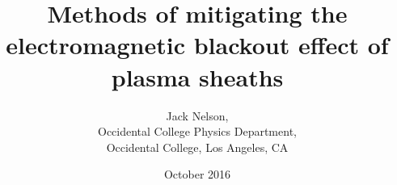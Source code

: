 \documentclass[twocolumn]{article}
\begin{document}
\title{Methods of mitigating the electromagnetic blackout effect of plasma sheaths}
\author{Jack Nelson,\\
	Occidental College Physics Department,\\
	Occidental College, Los Angeles, CA}
\date{October 2016}
\maketitle

\begin{abstract}

\end{abstract}

\section{}
\end{document}
